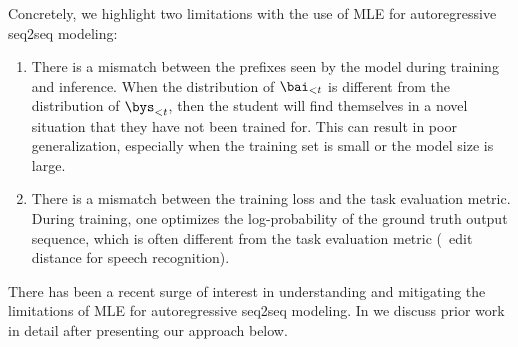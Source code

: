 Concretely, we highlight two limitations with the use of MLE for autoregressive seq2seq modeling:
\begin{enumerate}[noitemsep,parsep=0pt,leftmargin=7mm]
    \item There is a mismatch between the prefixes seen by the model during
    training and inference. When the distribution of
    $\bai_{<t}$ is different from the distribution of $\bys_{<t}$,
    then the student will find themselves in a novel situation that they have not been
    trained for. %
    This can result in poor generalization, especially when
    the training set is small or the model size is large.
    \item There is a mismatch between the training loss and the task
    evaluation metric. During training, one optimizes the log-probability of
    the ground truth output sequence, which is often different from
    the task evaluation metric (\eg~edit distance for speech recognition).
\end{enumerate}

There has been a recent surge of interest in understanding and
mitigating the limitations of MLE for autoregressive seq2seq modeling.
In  we discuss prior work in detail after presenting
our approach below.


